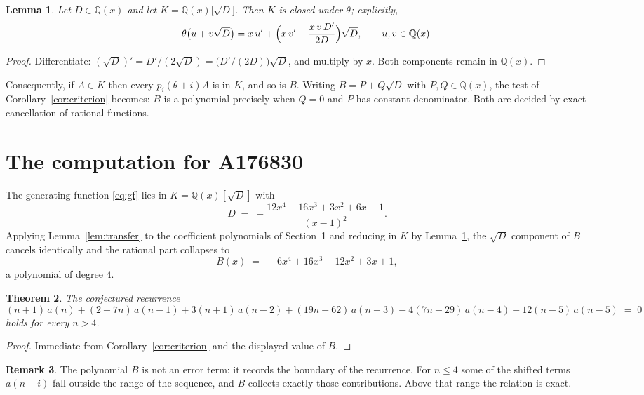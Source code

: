 \documentclass[11pt,a4paper]{article}
\theoremstyle{plain}
\newtheorem{theorem}{Theorem}
\newtheorem{lemma}[theorem]{Lemma}
\theoremstyle{definition}
\newtheorem{remark}[theorem]{Remark}
\begin{document}
\begin{lemma}\label{lem:field}
Let $D\in\mathbb{Q}(x)$ and let $K=\mathbb{Q}(x)\bigl[\sqrt{D}\bigr]$. Then $K$ is closed
under $\theta$; explicitly,
\[
\theta\bigl(u+v\sqrt{D}\bigr)=x\,u'+\Bigl(x\,v'+\frac{x\,v\,D'}{2D}\Bigr)\sqrt{D},
\qquad u,v\in\mathbb{Q}(x).
\]
\end{lemma}

\begin{proof}
Differentiate: $(\sqrt{D})'=D'/(2\sqrt{D})=\bigl(D'/(2D)\bigr)\sqrt{D}$, and multiply by
$x$. Both components remain in $\mathbb{Q}(x)$.
\end{proof}

Consequently, if $A\in K$ then every $p_{i}(\theta+i)A$ is in $K$, and so is $B$. Writing
$B=P+Q\sqrt{D}$ with $P,Q\in\mathbb{Q}(x)$, the test of Corollary~\ref{cor:criterion}
becomes: $B$ is a polynomial precisely when $Q=0$ and $P$ has constant denominator. Both
are decided by exact cancellation of rational functions.

\section{The computation for A176830}

The generating function \eqref{eq:gf} lies in $K=\mathbb{Q}(x)[\sqrt{D}]$ with
\[
D \;=\; - \frac{12 x^{4} - 16 x^{3} + 3 x^{2} + 6 x - 1}{\left(x - 1\right)^{2}} .
\]
Applying Lemma~\ref{lem:transfer} to the coefficient polynomials of Section~1 and reducing
in $K$ by Lemma~\ref{lem:field}, the $\sqrt{D}$ component of $B$ cancels identically and
the rational part collapses to
\[
B(x)\;=\;- 6 x^{4} + 16 x^{3} - 12 x^{2} + 3 x + 1 ,
\]
a polynomial of degree $4$.

\begin{theorem}
The conjectured recurrence
\[
(n + 1)\,a(n) + (2 - 7 n)\,a(n-1) + 3 \left(n + 1\right)\,a(n-2) + (19 n - 62)\,a(n-3) -  4 \left(7 n - 29\right)\,a(n-4) + 12 \left(n - 5\right)\,a(n-5) \;=\;0
\]
holds for every $n>4$.
\end{theorem}

\begin{proof}
Immediate from Corollary~\ref{cor:criterion} and the displayed value of $B$.
\end{proof}

\begin{remark}
The polynomial $B$ is not an error term: it records the boundary of the recurrence. For
$n\le4$ some of the shifted terms $a(n-i)$ fall outside the range of the sequence,
and $B$ collects exactly those contributions. Above that range the relation is exact.
\end{remark}
\end{document}

